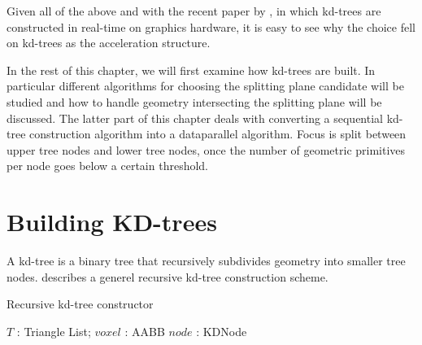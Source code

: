 Given all of the above and with the recent paper by \zhou{}, in which
kd-trees are constructed in real-time on graphics hardware, it is easy
to see why the choice fell on kd-trees as the acceleration structure.


In the rest of this chapter, we will first examine how kd-trees are
built. In particular different algorithms for choosing the splitting
plane candidate will be studied and how to handle geometry
intersecting the splitting plane will be discussed. The latter part of
this chapter deals with converting a sequential kd-tree construction
algorithm into a dataparallel algorithm. Focus is split between upper
tree nodes and lower tree nodes, once the number of geometric
primitives per node goes below a certain threshold.

\section{Building KD-trees}

A kd-tree is a binary tree that recursively subdivides geometry into
smaller tree nodes.  describes a generel
recursive kd-tree construction scheme.

\begin{algorithm}
  \caption{Recursive kd-tree constructor}
  \label{alg:kdTreeCreator}
  \begin{algorithmic}
              {$T$ : Triangle List; $voxel$ : AABB}
              {$node$ : KDNode}
              {
                \ELSE
                \ENDIF}
  \end{algorithmic}
\end{algorithm}


